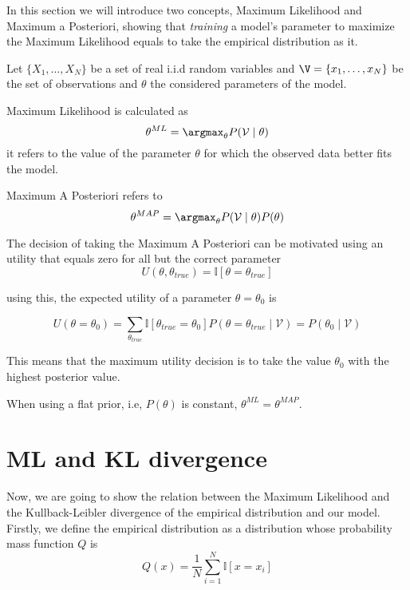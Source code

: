 
In this section we will introduce two concepts, Maximum Likelihood and Maximum a
Posteriori, showing that \emph{training} a model's parameter to maximize the
Maximum Likelihood equals to take the empirical distribution as it.

Let \(\{X_{1},\dots, X_{N}\}\) be a set of real i.i.d random variables and \(\V = \{x_{1}, \dots, x_{N}\}\) be the set of observations and \(\theta\) the considered parameters of the model.

\begin{definition}
  Maximum Likelihood is calculated as
  \[
    \theta^{ML} = \argmax_\theta P(\mathcal{V} \mid \theta)
  \]
   it refers to the value of the parameter
\(\theta\) for which the observed data better fits the model.
\end{definition}

\begin{definition}
  Maximum A Posteriori refers to
  \[
    \theta^{MAP} = \argmax_\theta P(\mathcal{V} \mid \theta)P(\theta)
  \]
\end{definition}

The decision of taking the Maximum A Posteriori can be motivated using an
utility that equals zero for all but the correct parameter
\[
  U(\theta, \theta_{true}) = \mathbb{I}[\theta = \theta_{true}]
\]

using this, the expected utility of a parameter \(\theta = \theta_0\) is

\[
  U(\theta = \theta_0) = \sum_{\theta_{true}}\mathbb{I}[\theta_{true} = \theta_0]P(\theta = \theta_{true}  \mid  \mathcal{V}) = P(\theta_0  \mid  \mathcal{V})
\]

This means that the maximum utility decision is to take the value \(\theta_0\)
with the highest posterior value.

\begin{remark}
  When using a flat prior, i.e, \(P(\theta)\) is constant, \(\theta^{ML}= \theta ^{MAP}\).
\end{remark}

\section{ML and KL divergence}

Now, we are going to show the relation between the Maximum Likelihood and the
Kullback-Leibler divergence of the empirical distribution and our model.
Firstly, we define the empirical distribution as a distribution whose probability mass function
\(Q\) is
\[
  Q(x) = \frac{1}{N}\sum_{i = 1}^N \mathbb{I}[x = x_i]
\]

